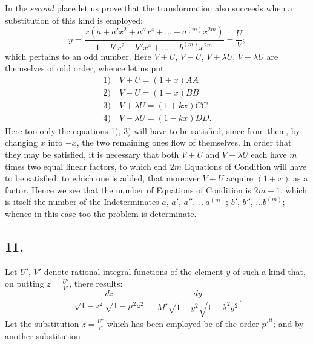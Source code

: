 \documentclass{article}
\begin{document}
In the \emph{second} place let us prove that the transformation also succeeds when a substitution of this kind is employed:
\[
y=\frac{x\left(a+a'x^{2}+a''x^{4}+\ldots+a^{(m)}x^{2m}\right)}{1+b'x^{2}+b''x^{4}+\ldots+b^{(m)}x^{2m}}=\frac{U}{V};
\]
which pertains to an odd number. Here $V+U$, $V-U$, $V+\lambda U$, $V-\lambda U$ are themselves of odd order, whence let us put:
\[
\begin{gathered}
\text{1)}\quad V+U=(1+x)AA\\
\text{2)}\quad V-U=(1-x)BB\\
\text{3)}\quad V+\lambda U=(1+kx)CC\\
\text{4)}\quad V-\lambda U=(1-kx)DD.
\end{gathered}
\]
Here too only the equations 1), 3) will have to be satisfied, since from them, by changing $x$ into $-x$, the two remaining ones flow of themselves. In order that they may be satisfied, it is necessary that both $V+U$ and $V+\lambda U$ each have $m$ times two equal linear factors, to which end $2m$ Equations of Condition will have to be satisfied, to which one is added, that moreover $V+U$ acquire $(1+x)$ as a factor. Hence we see that the number of Equations of Condition is $2m+1$, which is itself the number of the Indeterminates $a$, $a'$, $a''$, $.\,.\,a^{(m)}$; $b'$, $b''$, $\ldots b^{(m)}$; whence in this case too the problem is determinate.

\subsection*{11.}

Let $U'$, $V'$ denote rational integral functions of the element $y$ of such a kind that, on putting $z=\frac{U'}{V'}$, there results:
\[
\frac{dz}{\sqrt{1-z^{2}}\sqrt{1-\mu^{2}z^{2}}}=\frac{dy}{M'\sqrt{1-y^{2}}\sqrt{1-\lambda^{2}y^{2}}}.
\]
Let the substitution $z=\frac{U'}{V'}$ which has been employed be of the order $p'^{\mathrm{ti}}$; and by another substitution
\end{document}
